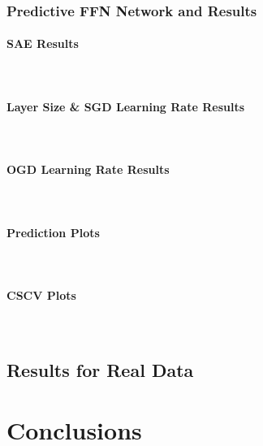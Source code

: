\documentclass[a4paper,latin]{paper}
\begin{document}
\subsubsection{Predictive FFN Network and Results}

\paragraph{SAE Results}\mbox{}\\
\paragraph{Layer Size \& SGD Learning Rate Results}\mbox{}\\
\paragraph{OGD Learning Rate Results}\mbox{}\\
\paragraph{Prediction Plots}\mbox{}\\
\paragraph{CSCV Plots}\mbox{}\\
\subsection{Results for Real Data}

\newpage
\section{Conclusions}\label{Conclusion}
\end{document}
